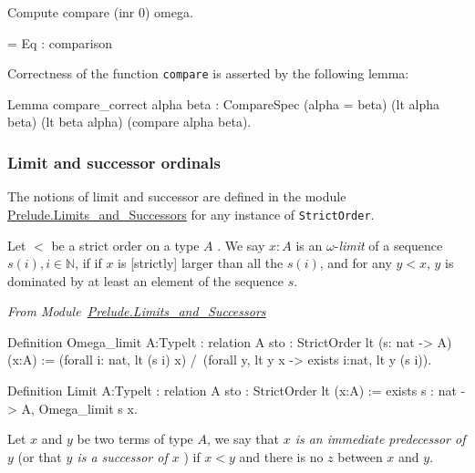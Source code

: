 \begin{Coqsrc}
Compute compare (inr 0) omega.  
\end{Coqsrc}
 
 \begin{Coqanswer}
= Eq : comparison
\end{Coqanswer}
 

Correctness of the function \texttt{compare} is asserted by the following lemma:

\begin{Coqsrc}
Lemma compare_correct alpha beta :
    CompareSpec (alpha = beta) (lt alpha beta) (lt beta alpha)
              (compare alpha beta).
\end{Coqsrc}


\subsubsection{Limit and successor ordinals}

The notions of limit and successor are defined in the module 
\href{../src/html/hydras.Prelude.Limits_and_Successors.html}{Prelude.Limits\_and\_Successors} for any instance of
\texttt{StrictOrder}.



Let $<$ be a strict order on a type $A$ .
We say $x:A$ is an  $\omega$-\emph{limit} of  a sequence $s(i), i\in\mathbb{N}$, if
 if $x$ is [strictly] larger than all the $s(i)$, and for any
$y<x$, $y$ is dominated by at least an element of  the sequence $s$.

\vspace{4pt}

\noindent\emph{From Module~\href{../src/html/hydras.Prelude.Limits_and_Successors.html}{Prelude.Limits\_and\_Successors}}

\begin{Coqsrc}
Definition  Omega_limit
            {A:Type}{lt : relation A}
           {sto : StrictOrder lt} (s: nat -> A) (x:A)  :=
  (forall i: nat, lt (s i) x) /\
  (forall y, lt y  x -> exists i:nat, lt y (s i)).

Definition Limit   {A:Type}{lt : relation A}
           {sto : StrictOrder lt}  (x:A)  :=
  exists s : nat -> A, Omega_limit s x.
 \end{Coqsrc}

Let $x$ and $y$ be two terms of type $A$, we say that \emph{$x$ is an immediate predecessor of $y$}
(or that \emph{$y$ is a  successor of $x$ }) if $x<y$ and there is no $z$ between $x$ and $y$.



